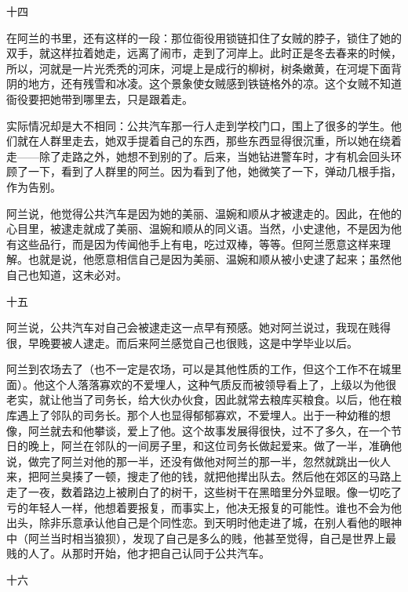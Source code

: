 十四 

在阿兰的书里，还有这样的一段：那位衙役用锁链扣住了女贼的脖子，锁住了她的双手，就这样拉着她走，远离了闹市，走到了河岸上。此时正是冬去春来的时候，所以，河就是一片光秃秃的河床，河堤上是成行的柳树，树条嫩黄，在河堤下面背阴的地方，还有残雪和冰凌。这个景象使女贼感到铁链格外的凉。这个女贼不知道衙役要把她带到哪里去，只是跟着走。 

实际情况却是大不相同：公共汽车那一行人走到学校门口，围上了很多的学生。他们就在人群里走去，她双手提着自己的东西，那些东西显得很沉重，所以她在绕着走——除了走路之外，她想不到别的了。后来，当她钻进警车时，才有机会回头环顾了一下，看到了人群里的阿兰。因为看到了他，她微笑了一下，弹动几根手指，作为告别。 

阿兰说，他觉得公共汽车是因为她的美丽、温婉和顺从才被逮走的。因此，在他的心目里，被逮走就成了美丽、温婉和顺从的同义语。当然，小史逮他，不是因为他有这些品行，而是因为传闻他手上有电，吃过双棒，等等。但阿兰愿意这样来理解。也就是说，他愿意相信自己是因为美丽、温婉和顺从被小史逮了起来；虽然他自己也知道，这未必对。 

十五 

阿兰说，公共汽车对自己会被逮走这一点早有预感。她对阿兰说过，我现在贱得很，早晚要被人逮走。而后来阿兰感觉自己也很贱，这是中学毕业以后。 

阿兰到农场去了（也不一定是农场，可以是其他性质的工作，但这个工作不在城里面）。他这个人落落寡欢的不爱埋人，这种气质反而被领导看上了，上级以为他很老实，就让他当了司务长，给大伙办伙食，因此就常去粮库买粮食。以后，他在粮库遇上了邻队的司务长。那个人也显得郁郁寡欢，不爱埋人。出于一种幼稚的想像，阿兰就去和他攀谈，爱上了他。这个故事发展得很快，过不了多久，在一个节日的晚上，阿兰在邻队的一间房子里，和这位司务长做起爱来。做了一半，准确他说，做完了阿兰对他的那一半，还没有做他对阿兰的那一半，忽然就跳出一伙人来，把阿兰臭揍了一顿，搜走了他的钱，就把他撵出队去。然后他在郊区的马路上走了一夜，数着路边上被刷白了的树干，这些树干在黑暗里分外显眼。像一切吃了亏的年轻人一样，他想着要报复，而事实上，他决无报复的可能性。谁也不会为他出头，除非乐意承认他自己是个同性恋。到天明时他走进了城，在别人看他的眼神中（阿兰当时相当狼狈），发现了自己是多么的贱，他甚至觉得，自己是世界上最贱的人了。从那时开始，他才把自己认同于公共汽车。 

十六 

